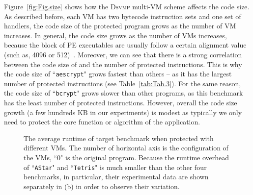 \documentclass[preprint,12pt,3p]{elsarticle}
\newcommand{\DSVMP}{\textsc{Dsvmp}\xspace}
\begin{document}
Figure~\ref{fig:Fig.size} shows how the \DSVMP multi-VM scheme affects the code size.
As described before, each VM has two bytecode instruction sets and one set of handlers,
the code size of the protected program grows as the number of VM increases.
In general, the code size grows as the number of VMs increases, because the block of PE executables
are usually follow a certain alignment value (such as, 4096 or 512)~\cite{pe}.
Moreover, we can see that there is a strong correlation between the code size of and the number of protected instructions.
This is why the code size of ``\texttt{aescrypt}" grows fastest than others -- as it has
the largest number of protected instructions (see Table~\ref{tab:Tab.3}).
For the same reason, the code size of ``\texttt{bcrypt}" grows slower than other programs,
as this benchmark has the least number of protected instructions.
However, overall the code size growth (a few hundreds KB in our experiments) is modest as typically we only need
to protect the core function or algorithm of the application.

\begin{figure}[t]
\centering
{}
\caption{The average runtime of target benchmark when protected with different VMs. The number of horizontal axis is the configuration of the VMs, ``0" is the original program. Because the runtime overhead of ``\texttt{AStar}" and ``\texttt{Tetris}" is much smaller than the other four benchmarks, in particular, their experimental data are shown separately in (b) in order to observe their variation.}\label{fig:Fig.time}
\end{figure}
\end{document}
